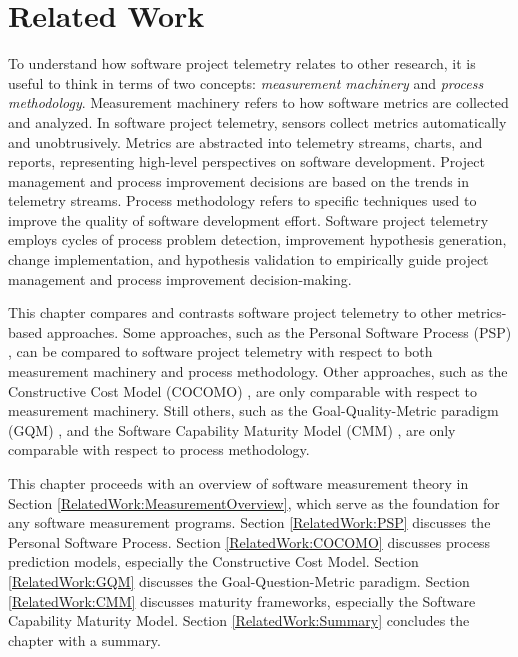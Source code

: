 \chapter{Related Work}
\label{Chapter:RelatedWork}

To understand how software project telemetry relates to other research, it is useful to think in terms of two concepts: \textit{measurement machinery} and \textit{process methodology}. Measurement machinery refers to how software metrics are collected and analyzed. In software project telemetry, sensors collect metrics automatically and unobtrusively. Metrics are abstracted into telemetry streams, charts, and reports, representing high-level perspectives on software development. Project management and process improvement decisions are based on the trends in telemetry streams. Process methodology refers to specific techniques used to improve the quality of software development effort. Software project telemetry employs cycles of process problem detection, improvement hypothesis generation, change implementation, and hypothesis validation to empirically guide project management and process improvement decision-making.

This chapter compares and contrasts software project telemetry to other metrics-based approaches. Some approaches, such as the Personal Software Process (PSP) \cite{Humphrey:1995, Humphrey:1996}, can be compared to software project telemetry with respect to both measurement machinery and process methodology. Other approaches, such as the Constructive Cost Model (COCOMO)  \cite{Cocomo:1981, Cocomo:2000}, are only comparable with respect to measurement machinery. Still others, such as the Goal-Quality-Metric paradigm (GQM) \cite{Basili:1988, Basili:1992}, and the Software Capability Maturity Model (CMM) \cite{Paulk:1993, SEI:1995}, are only comparable with respect to process methodology. 


This chapter proceeds with an overview of software measurement theory in Section \ref{RelatedWork:MeasurementOverview}, which serve as the foundation for any software measurement programs.
Section \ref{RelatedWork:PSP} discusses the Personal Software Process. 
Section \ref{RelatedWork:COCOMO} discusses process prediction models, especially the Constructive Cost Model. 
Section \ref{RelatedWork:GQM} discusses the Goal-Question-Metric paradigm.
Section \ref{RelatedWork:CMM} discusses maturity frameworks, especially the Software Capability Maturity Model.
Section \ref{RelatedWork:Summary} concludes the chapter with a summary.




